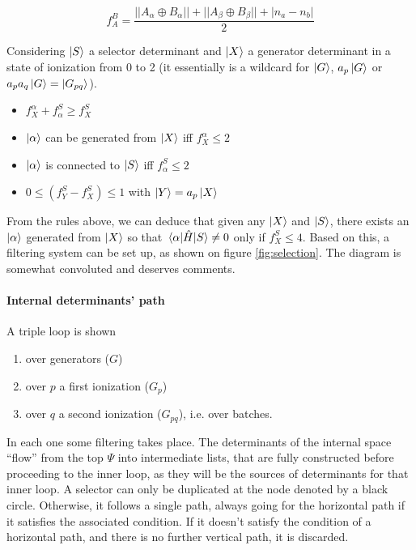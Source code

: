 \documentclass[./thesis.tex]{subfiles}
\begin{document}
\begin{equation}
f_A^B = \frac{||A_\alpha \oplus B_\alpha|| + ||A_\beta \oplus B_\beta|| + |n_a-n_b|}{2}
\end{equation}


Considering $\ket S$ a selector determinant and $\ket X$ a generator determinant in a state of ionization from 0 to 2 (it essentially is a wildcard for $\ket G$, $a_{p} \ket G$ or $a_{p} a_{q} \ket G = \ket {G_{pq}}$).

\begin{itemize}
\item
$f_X^\alpha + f_\alpha^S \geq f_X^S$
\item
$\ket \alpha$ can be generated from $\ket X$ iff $f_X^\alpha \leq 2$
\item
$\ket \alpha$ is connected to $\ket S$ iff $f_\alpha^S \leq 2$
\item
$0 \leq (f_Y^S - f_X^S) \leq 1$ with $\ket Y = a_p \ket X$
\end{itemize}


From the rules above, we can deduce that given any $\ket X$ and $\ket S$, there exists an ${\ket{\alpha}}$ generated from $\ket X$ so that $\mel{\alpha}{\hat{H}}{S} \neq 0$ only if $f_X^S \leq 4$.
Based on this, a filtering system can be set up, as shown on figure \ref{fig:selection}. The diagram is somewhat convoluted and deserves comments.

\paragraph{Internal determinants' path}
 
A triple loop is shown

\begin{enumerate}
\item
over generators ($G$)
\item
over $p$ a first ionization ($G_p$)
\item
over $q$ a second ionization ($G_{pq}$), i.e. over batches.
\end{enumerate}

In each one some filtering takes place. The determinants of the internal space ``flow'' from the top $\Psi$ into intermediate lists, that are fully constructed before proceeding to the inner loop, as they will be the sources of determinants for that inner loop.
A selector can only be duplicated at the node denoted by a black circle. Otherwise, it follows a single path, always going for the horizontal path if it satisfies the associated condition.
If it doesn't satisfy the condition of a horizontal path, and there is no further vertical path, it is discarded.
\end{document}
